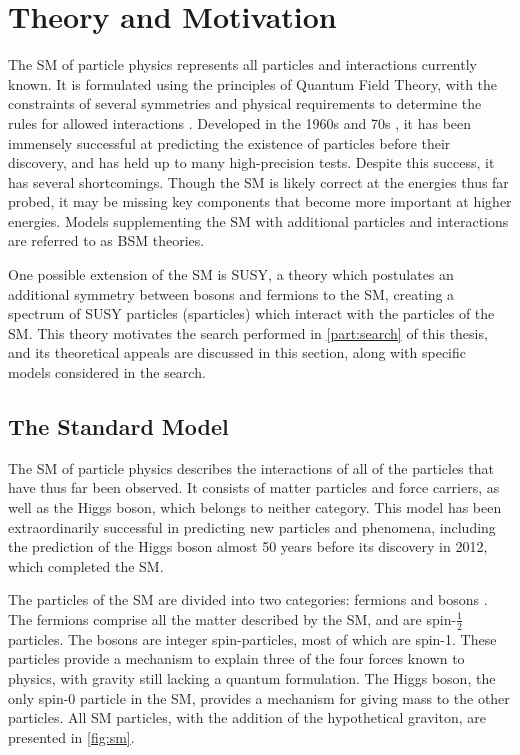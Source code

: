 
\chapter{Theory and Motivation} %

\label{ch:theory} %
The \acf{SM} of particle physics represents all particles and interactions currently known. It is formulated using the principles of Quantum Field Theory, with the constraints of several symmetries and physical requirements to determine the rules for allowed interactions \cite{Burgess:2007zi}. Developed in the 1960s and 70s \cite{Glashow:1961tr, PhysRev.127.331, PhysRevLett.19.1264}, it has been immensely successful at predicting the existence of particles before their discovery, and has held up to many high-precision tests. Despite this success, it has several shortcomings. Though the \ac{SM} is likely correct at the energies thus far probed, it may be missing key components that become more important at higher energies. Models supplementing the \ac{SM} with additional particles and interactions are referred to as \ac{BSM} theories. 

One possible extension of the \ac{SM} is \ac{SUSY}, a theory which postulates an additional symmetry between bosons and fermions to the \ac{SM}, creating a spectrum of \ac{SUSY} particles (sparticles) which interact with the particles of the \ac{SM}. This theory motivates the search performed in \autoref{part:search} of this thesis, and its theoretical appeals are discussed in this section, along with specific models considered in the search. 


\section{The Standard Model}
\label{sec:standard_model}
The \ac{SM} of particle physics describes the interactions of all of the particles that have thus far been observed. It consists of matter particles and force carriers, as well as the Higgs boson, which belongs to neither category. This model has been extraordinarily successful in predicting new particles and phenomena, including the prediction of the Higgs boson almost 50 years before its discovery in 2012, which completed the \ac{SM}.  

The particles of the \ac{SM} are divided into two categories: fermions and bosons \cite{Burgess:2007zi}. The fermions comprise all the matter described by the \ac{SM}, and are spin-$\frac{1}{2}$ particles. The bosons are integer spin-particles, most of which are spin-1. These particles provide a mechanism to explain three of the four forces known to physics, with gravity still lacking a quantum formulation. The Higgs boson, the only spin-0 particle in the \ac{SM}, provides a mechanism for giving mass to the other particles. All \ac{SM} particles, with the addition of the hypothetical graviton, are presented in \autoref{fig:sm}. 

